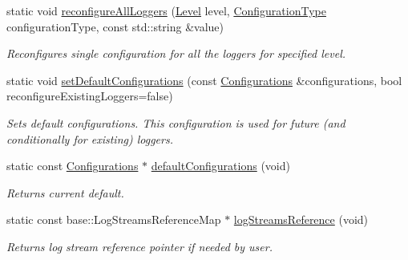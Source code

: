 \begin{DoxyCompactItemize}
\mbox{\label{classel_1_1_loggers_ab24b99e5bb3c907d1418ee3266f15397}} 
static void \hyperlink{classel_1_1_loggers_ab24b99e5bb3c907d1418ee3266f15397}{reconfigure\+All\+Loggers} (\hyperlink{namespaceel_ab0ac6091262344c52dd2d3ad099e8e36}{Level} level, \hyperlink{namespaceel_a281f5db6d6163678bc68a8b23b59e124}{Configuration\+Type} configuration\+Type, const std\+::string \&value)
\begin{DoxyCompactList}\small\item\em Reconfigures single configuration for all the loggers for specified level. \end{DoxyCompactList}\item 
\mbox{\label{classel_1_1_loggers_ab9fb62a8ff904ff887fefde3282f46a4}} 
static void \hyperlink{classel_1_1_loggers_ab9fb62a8ff904ff887fefde3282f46a4}{set\+Default\+Configurations} (const \hyperlink{classel_1_1_configurations}{Configurations} \&configurations, bool reconfigure\+Existing\+Loggers=false)
\begin{DoxyCompactList}\small\item\em Sets default configurations. This configuration is used for future (and conditionally for existing) loggers. \end{DoxyCompactList}\item 
\mbox{\label{classel_1_1_loggers_a96f2336fafdc3ef2c4df01a73ae5ffb7}} 
static const \hyperlink{classel_1_1_configurations}{Configurations} $\ast$ \hyperlink{classel_1_1_loggers_a96f2336fafdc3ef2c4df01a73ae5ffb7}{default\+Configurations} (void)
\begin{DoxyCompactList}\small\item\em Returns current default. \end{DoxyCompactList}\item 
\mbox{\label{classel_1_1_loggers_ad17312c9474d94bc98efcaf08ca279a4}} 
static const base\+::\+Log\+Streams\+Reference\+Map $\ast$ \hyperlink{classel_1_1_loggers_ad17312c9474d94bc98efcaf08ca279a4}{log\+Streams\+Reference} (void)
\begin{DoxyCompactList}\small\item\em Returns log stream reference pointer if needed by user. \end{DoxyCompactList}\item 
\mbox{\label{classel_1_1_loggers_af296007c3eb3b71602ec80ff59875b46}} 

\end{DoxyCompactItemize}
